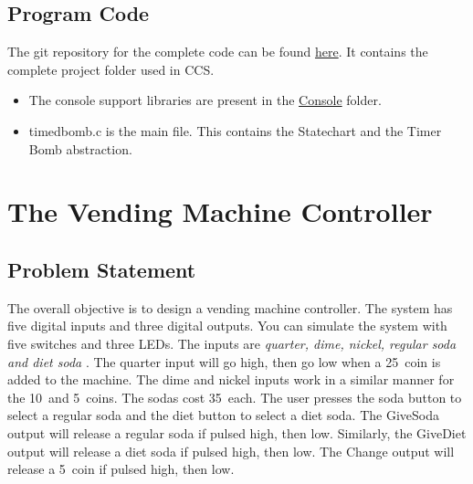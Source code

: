 \documentclass[a4paper,12pt,oneside]{book}
\begin{document}
\subsection{Program Code}
\qquad The git repository for the complete code can be found \href{https://github.com/eYSIP-2017/eYSIP-2017_Game_Development-TI-RTOS/tree/master/Documentation/Timer\%20Bomb/Timer\%20Bomb\%20-\%20Code/TimedBomb_Final}{here}. It contains the complete project folder used in CCS. 
\begin{itemize}
  \item The console support libraries are present in the \href{https://github.com/eYSIP-2017/eYSIP-2017_Game_Development-TI-RTOS/tree/master/Documentation/Timer\%20Bomb/Timer\%20Bomb\%20-\%20Code/TimedBomb_Final/Console}{Console} folder. 
  \item timedbomb.c is the main file. This contains the Statechart and  the Timer Bomb abstraction.
\end{itemize}

\section{The Vending Machine Controller}
\subsection{Problem Statement}
\qquad The overall objective is to design a vending machine controller. The system has five digital inputs and three digital outputs. You can simulate the system with five switches and three LEDs. The inputs are \textit{quarter, dime, nickel, regular soda and diet soda} . The quarter input will go high, then go low when a 25\textcent \  coin is added to the machine. The dime and nickel inputs work in a similar manner for the 10\textcent \  and 5\textcent \ coins. The sodas cost 35\textcent \ each. The user presses the soda button to select a regular soda and the diet button to select a diet soda. The GiveSoda output will release a regular soda if pulsed high, then low. Similarly, the GiveDiet output will release a diet soda if pulsed high, then low. The Change output will release a 5\textcent \ coin if pulsed high, then low.
\end{document}
